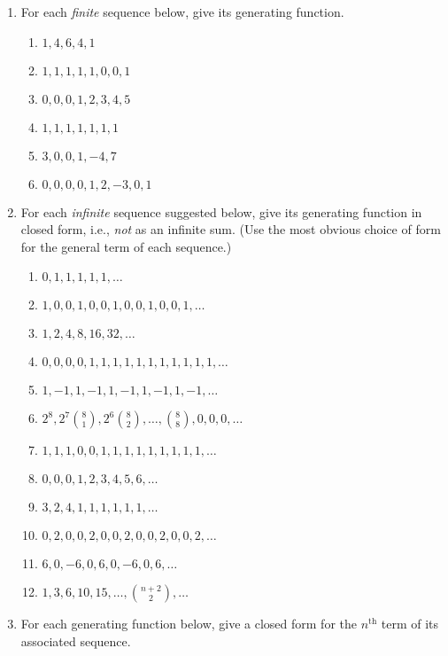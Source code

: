\begin{enumerate}
\item For each \emph{finite} sequence below, give its 
  generating function.
  \begin{multicols}{3}
    \begin{enumerate}
    \item $1, 4, 6, 4, 1$
    \item $1,1,1,1,1,0,0,1$
    \item $0,0,0,1,2,3,4,5$
    \item $1,1,1,1,1,1,1$
    \item $3,0,0,1,-4,7$
    \item $0,0,0,0,1,2,-3,0,1$
    \end{enumerate}
  \end{multicols}
\item For each \emph{infinite} sequence suggested below, give its
   generating function in closed form, i.e., \emph{not} as an
  infinite sum. (Use the most obvious choice of form for the general
  term of each sequence.)
  \begin{multicols}{2}
    \begin{enumerate}
    \item $0,1,1,1,1,1,\dots$
    \item $1,0,0,1,0,0,1,0,0,1,0,0,1,\dots$
    \item $1,2,4,8,16,32,\dots$
    \item $0,0,0,0,1,1,1,1,1,1,1,1,1,1,1,\dots$
    \item $1,-1,1,-1,1,-1,1,-1,1,-1,\dots$
    \item $\displaystyle 2^8,2^7\binom{8}{1}, 2^6\binom{8}{2},\dots,\binom{8}{8},0,0,0,\dots$
    \item $1,1,1,0,0,1,1,1,1,1,1,1,1,1,\dots$
    \item $0,0,0,1,2,3,4,5,6,\dots$
    \item $3,2,4,1,1,1,1,1,1,\dots$
    \item $0,2,0,0,2,0,0,2,0,0,2,0,0,2,\dots$
    \item $6,0,-6,0,6,0,-6,0,6,\dots$
    \item $\displaystyle 1,3,6,10,15,\dots,\binom{n+2}{2},\dots$
  \end{enumerate}
  \end{multicols}
\item For each generating function below, give a closed form
  for the $n^{\text{th}}$ term of its associated sequence.
  \begin{enumerate}
    \begin{multicols}{3}

\end{multicols}
\end{enumerate}
\end{enumerate}
